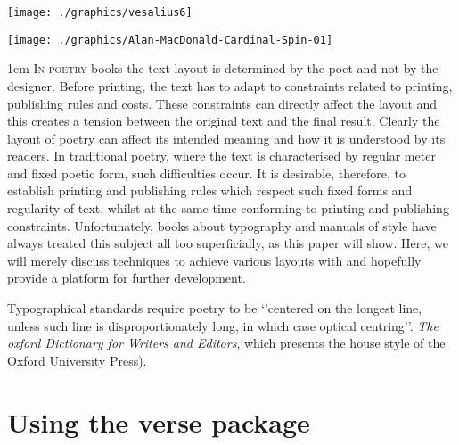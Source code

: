 \texttt{[image: ./graphics/vesalius6]}

\clearpage
\thispagestyle{plain}
\vskip0pt

\hspace*{-0.025\textwidth}\texttt{[image: ./graphics/Alan-MacDonald-Cardinal-Spin-01]}


\normalsize

\begin{multicols}{2}
\parindent1em
\lettrine{I}{n poetry} books the text layout is determined by the poet and not by the 
designer. Before printing, the text has to adapt to constraints related to printing,  publishing rules 
and costs. These constraints can directly affect the layout and this creates a tension between the 
original text and the final result. Clearly the layout of poetry can affect its intended meaning and how it is 
understood by its readers. In traditional poetry, where the text is characterised by regular meter and fixed 
poetic form, such difficulties occur. It is desirable, therefore, to establish printing and publishing rules which 
respect such fixed forms and regularity of text, whilst at the same time conforming to printing and publishing 
constraints. Unfortunately, books about typography and manuals of style have always treated this subject all 
too superficially, as this paper will show. Here, we will merely discuss techniques to achieve various layouts with \latex and hopefully provide a platform for further development.
\end{multicols}

\pagebreak
\newcommand{\garden}{
I used to love my garden \\
But now my love is dead \\
For I found a bachelor's button \\
In black-eyed Susan's bed.
}
Typographical standards require poetry to be `'centered on the longest line, unless such line is disproportionately long, in which case optical centring''. \textit{The oxford Dictionary for Writers and Editors}, which presents the house style of
the Oxford University Press). 


\section{Using the verse package}



